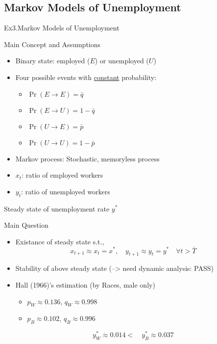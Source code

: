\documentclass[final]{beamer}
\begin{document}
\subsection{Markov Models of Unemployment} %
\label{sub:markov_models_of_unemployment}
\begin{frame}[t]{Ex3.Markov Models of Unemployment}
	\begin{block}
		{Main Concept and Assumptions}
		\begin{itemize}
			\item Binary state: employed ($E$) or unemployed ($U$)
			\item Four possible events with \uline{constant} probability: 
			\begin{itemize}
				\item $\Pr(E\rightarrow E)=\bar q$
				\item $\Pr(E\rightarrow U)=1-\bar q$
				\item $\Pr(U\rightarrow E)=\bar p$
				\item $\Pr(U\rightarrow U)=1-\bar p$
			\end{itemize}
			\item Markov process: Stochastic, memoryless process
			\item $x_t$: ratio of employed workers
			\item $y_t$: ratio of unemployed workers
		\end{itemize}
	\end{block}
\end{frame}
\begin{frame}[t]{Steady state of unemployment rate $y^\ast$}
	\begin{block}
		{Main Question}
		\begin{itemize}
			\item Existance of steady state s.t., 
			\[
				x_{t+1} \approx x_t = x^\ast,\quad y_{t+1} \approx y_t=y^\ast \quad \forall t>\bar T
			\]
			\item Stability of above steady state (--> need dynamic analysis: PASS)
		\end{itemize}
	\end{block}
	\begin{itemize}
		\item Hall (1966)'s estimation (by Races, male only)
		\begin{itemize}
			\item $p_{W}\approx 0.136$, $q_{W}\approx 0.998$
			\item $p_{B}\approx 0.102$, $q_{B}\approx 0.996$
		\end{itemize}
		\[
			y_{W}^\ast \approx 0.014 < \quad y_{B}^\ast \approx 0.037
		\]
	\end{itemize}
\end{frame}
\end{document}
